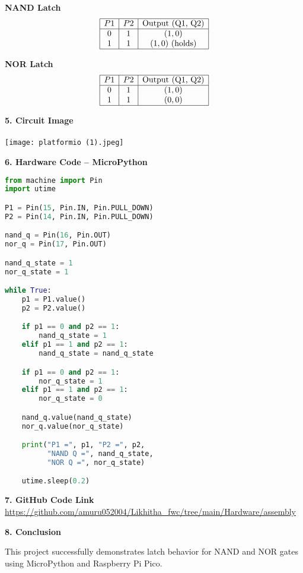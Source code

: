 \documentclass[12pt]{article}
\begin{document}
\vspace{2em}
\begin{minipage}{0.45\linewidth}
\centering
\textbf{NAND Latch} \\
\[
\begin{array}{|c|c|c|}
\hline
P1 & P2 & \text{Output (Q1, Q2)} \\
\hline
0 & 1 & (1, 0) \\
1 & 1 & (1, 0) \text{ (holds)} \\
\hline
\end{array}
\]
\end{minipage}
\hfill
\begin{minipage}{0.45\linewidth}
\centering
\textbf{NOR Latch} \\
\[
\begin{array}{|c|c|c|}
\hline
P1 & P2 & \text{Output (Q1, Q2)} \\
\hline
0 & 1 & (1, 0) \\
1 & 1 & (0, 0) \\
\hline
\end{array}
\]
\end{minipage}

\vspace{14em}
\noindent\textbf{5. Circuit Image} \\
\\
\texttt{[image: platformio (1).jpeg]}

\vspace{1em}
\noindent\textbf{6. Hardware Code – MicroPython}
\begin{lstlisting}[language=Python]
from machine import Pin
import utime

P1 = Pin(15, Pin.IN, Pin.PULL_DOWN)
P2 = Pin(14, Pin.IN, Pin.PULL_DOWN)

nand_q = Pin(16, Pin.OUT)
nor_q = Pin(17, Pin.OUT)

nand_q_state = 1
nor_q_state = 1

while True:
    p1 = P1.value()
    p2 = P2.value()

    if p1 == 0 and p2 == 1:
        nand_q_state = 1
    elif p1 == 1 and p2 == 1:
        nand_q_state = nand_q_state

    if p1 == 0 and p2 == 1:
        nor_q_state = 1
    elif p1 == 1 and p2 == 1:
        nor_q_state = 0

    nand_q.value(nand_q_state)
    nor_q.value(nor_q_state)

    print("P1 =", p1, "P2 =", p2, 
          "NAND Q =", nand_q_state, 
          "NOR Q =", nor_q_state)

    utime.sleep(0.2)
\end{lstlisting}

\vspace{1em}
\noindent\textbf{7. GitHub Code Link} \\
\url{https://github.com/amuru052004/Likhitha_fwc/tree/main/Hardware/assembly}

\vspace{1em}
\noindent\textbf{8. Conclusion}

This project successfully demonstrates latch behavior for NAND and NOR gates using MicroPython and Raspberry Pi Pico. 
\end{document}
